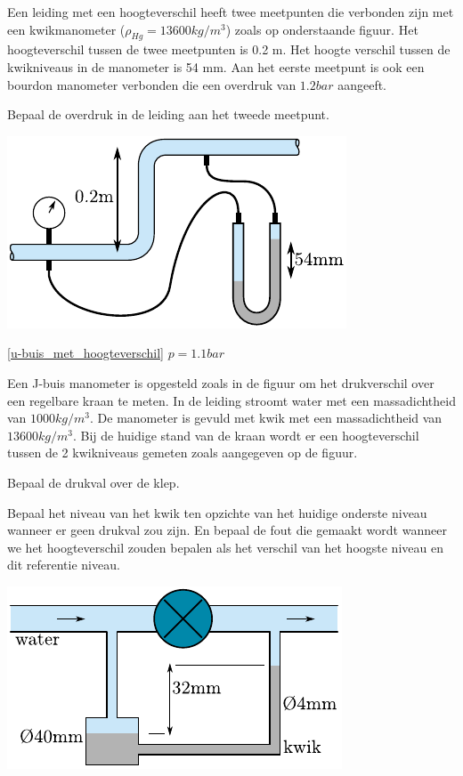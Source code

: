 \begin{toepassing}[*]
	\label{u-buis_met_hoogteverschil}
Een leiding met een hoogteverschil heeft twee meetpunten die verbonden zijn met een kwikmanometer ($\rho_{Hg}=13600 \unit{kg/m^3}$) zoals op onderstaande figuur. Het hoogteverschil tussen de twee meetpunten is 0.2 m. Het hoogte verschil tussen de kwikniveaus in de manometer is 54 mm. Aan het eerste meetpunt is ook een bourdon manometer verbonden die een overdruk van $1.2 \unit{bar}$ aangeeft.
		
Bepaal de overdruk in de leiding aan het tweede meetpunt.

	\centering
	\includegraphics{fig/hydrostatica/u-buis_met_hoogteverschil}
\end{toepassing}
\begin{antwoord}{\ref{u-buis_met_hoogteverschil}}
	$p = 1.1 \unit{bar}$
\end{antwoord}
\begin{toepassing}
	\label{J-buis}
Een J-buis manometer is opgesteld zoals in de figuur om het drukverschil over een regelbare kraan te meten. In de leiding stroomt water met een massadichtheid van $1000 \unit{kg/m^3}$. De manometer is gevuld met kwik met een massadichtheid van $13600 \unit{kg/m^3}$. Bij de huidige stand van de kraan wordt er een hoogteverschil tussen de 2 kwikniveaus gemeten zoals aangegeven op de figuur.
		
Bepaal de drukval over de klep.
		
Bepaal het niveau van het kwik ten opzichte van het huidige onderste niveau wanneer er geen drukval zou zijn. En bepaal de fout die gemaakt wordt wanneer we het hoogteverschil zouden bepalen als het verschil van het hoogste niveau en dit referentie niveau.

	\centering
	\includegraphics{fig/hydrostatica/J-buis}
\end{toepassing}
